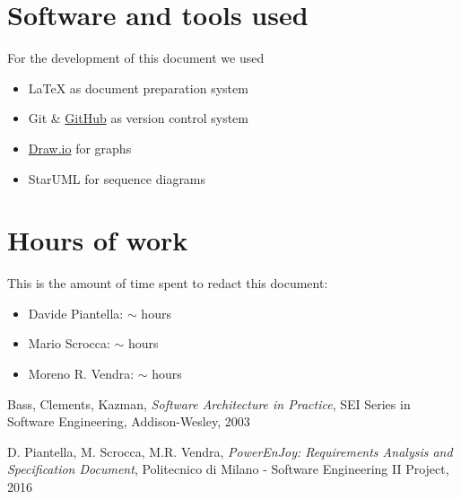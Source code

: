 \begin{appendices}

	\section{Software and tools used}
	For the development of this document we used
	\begin{itemize}
		\item \LaTeX{} as document preparation system
		\item Git \& \href{http://github.com}{GitHub} as version control system
		\item \href{http://draw.io}{Draw.io} for graphs 
		\item StarUML for sequence diagrams
	\end{itemize}
	
	\section{Hours of work}
	This is the amount of time spent to redact this document:
	\begin{itemize}
		\item Davide Piantella: $\sim$ hours
		\item Mario Scrocca: $\sim$ hours
		\item Moreno R. Vendra: $\sim$ hours
	\end{itemize}
	
\end{appendices}


\begin{thebibliography}{9}

Bass, Clements, Kazman, \emph{Software Architecture in Practice}, SEI Series in Software Engineering, Addison-­Wesley, 2003

D. Piantella, M. Scrocca, M.R. Vendra, \emph{PowerEnJoy: Requirements Analysis and Specification Document}, Politecnico di Milano - Software Engineering II Project, 2016

\end{thebibliography}